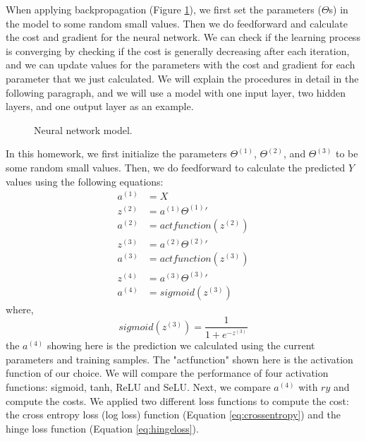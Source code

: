 \documentclass[UTF8,12pt]{article}
\begin{document}
	When applying backpropagation (Figure \ref{fig:2_NN}), we first set the parameters ($\Theta$s) in the model to some random small values. Then we do feedforward and calculate the cost and gradient for the neural network. We can check if the learning process is converging by checking if the cost is generally decreasing after each iteration, and we can update values for the parameters with the cost and gradient for each parameter that we just calculated. We will explain the procedures in detail in the following paragraph, and we will use a model with one input layer, two hidden layers, and one output layer as an example.
	\begin{figure}[!ht]
		\centering
		\caption{\label{fig:2_NN}Neural network model.}
	\end{figure}
	In this homework, we first initialize the parameters $\Theta^{(1)}$, $\Theta^{(2)}$, and $\Theta^{(3)}$ to be some random small values. Then, we do feedforward to calculate the predicted $Y$ values using the following equations:
	\begin{align}
	a^{(1)} &= X\\
	z^{(2)} &= a^{(1)}\Theta^{(1)}{'}\\a^{(2)} &= actfunction(z^{(2)})\\
	z^{(3)} &= a^{(2)}\Theta^{(2)}{'}\\a^{(3)} &= actfunction(z^{(3)})\\
	z^{(4)} &= a^{(3)}\Theta^{(3)}{'}\\a^{(4)} &= sigmoid(z^{(3)})
	\end{align}
	where,
	\begin{equation}
	sigmoid(z^{(3)})=\frac{1}{1+e^{-z^{(3)}}}
	\end{equation}
	the $a^{(4)}$ showing here is the prediction we calculated using the current parameters and training samples. The "actfunction" shown here is the activation function of our choice. We will compare the performance of four activation functions: sigmoid, tanh, ReLU and SeLU. Next, we compare $a^{(4)}$ with $ry$ and compute the costs. We applied two different loss functions to compute the cost: the cross entropy loss (log loss) function (Equation \ref{eq:crossentropy}) and the hinge loss function (Equation \ref{eq:hingeloss}).
\end{document}
